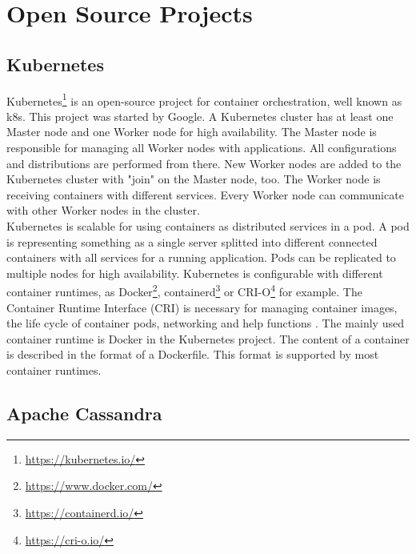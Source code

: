 \section{Open Source Projects}

\subsection{Kubernetes}

Kubernetes\footnote{\url{https://kubernetes.io/}} is an open-source project for container orchestration, well known as k8s. This project was started by Google. A Kubernetes cluster has at least one Master node and one Worker node for high availability. The Master node is responsible for managing all Worker nodes with applications. All configurations and distributions are performed from there. New Worker nodes are added to the Kubernetes cluster with "join" on the Master node, too. The Worker node is receiving containers with different services. Every Worker node can communicate with other Worker nodes in the cluster. \\
Kubernetes is scalable for using containers as distributed services in a pod. A pod is representing something as a single server splitted into different connected containers with all services for a running application. Pods can be replicated to multiple nodes for high availability. Kubernetes is configurable with different container runtimes, as Docker\footnote{\url{https://www.docker.com/}}, containerd\footnote{\url{https://containerd.io/}} or CRI-O\footnote{\url{https://cri-o.io/}} for example. The Container Runtime Interface (CRI) is necessary for managing container images, the life cycle of container pods, networking and help functions \cite[~p.16]{Scholl2019}. The mainly used container runtime is Docker in the Kubernetes project. The content of a container is described in the format of a Dockerfile. This format is supported by most container runtimes.


\subsection{Apache Cassandra}

